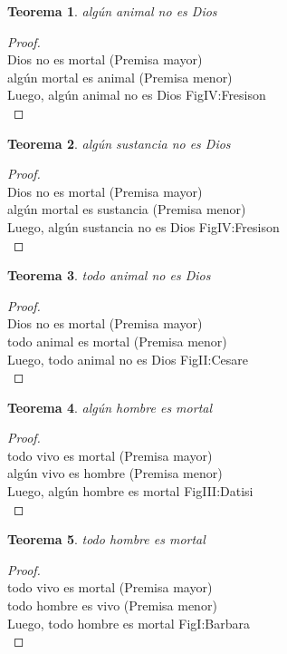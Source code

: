 ﻿\documentclass[12pt]{book}
\newtheorem{theorem}{Teorema}[chapter]
\newtheorem{proof}{Demostración}
\begin{document}
\begin{theorem}
algún animal no es Dios
\label{th: 56}
\end{theorem}\begin{proof}\\Dios no es mortal	 (Premisa mayor) \\algún mortal es animal	 (Premisa menor) \\Luego, algún animal no es Dios	FigIV:Fresison \\ \end{proof}
\begin{theorem}
algún sustancia no es Dios
\label{th: 57}
\end{theorem}\begin{proof}\\Dios no es mortal	 (Premisa mayor) \\algún mortal es sustancia	 (Premisa menor) \\Luego, algún sustancia no es Dios	FigIV:Fresison \\ \end{proof}
\begin{theorem}
todo animal no es Dios
\label{th: 58}
\end{theorem}\begin{proof}\\Dios no es mortal	 (Premisa mayor) \\todo animal es mortal	 (Premisa menor) \\Luego, todo animal no es Dios	FigII:Cesare \\ \end{proof}
\begin{theorem}
algún hombre es mortal
\label{th: 59}
\end{theorem}\begin{proof}\\todo vivo es mortal	 (Premisa mayor) \\algún vivo es hombre	 (Premisa menor) \\Luego, algún hombre es mortal	FigIII:Datisi \\ \end{proof}
\begin{theorem}
todo hombre es mortal
\label{th: 60}
\end{theorem}\begin{proof}\\todo vivo es mortal	 (Premisa mayor) \\todo hombre es vivo	 (Premisa menor) \\Luego, todo hombre es mortal	FigI:Barbara \\ \end{proof}
\end{document}
